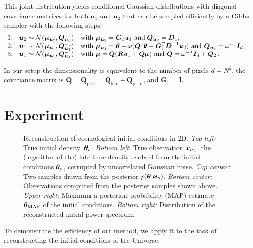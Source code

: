 This joint distribution yields conditional Gaussian distributions with diagonal covariance matrices for both $\bm u_1$ and $\bm u_2$ that can be sampled efficiently by a Gibbs sampler with the following steps:
\begin{equation}
\begin{array}{ccl}
    1. & \bm u_2\sim\mathcal{N}(\bm \mu_{\bm u_2}, \bm Q^{-1}_{\bm u_2}) & \text{with } \bm \mu_{\bm u_2} = \bm G_1 \bm u_1 \text{ and }\bm Q_{\boldsymbol u_2} = \boldsymbol D_1, \\
    2.  & \bm u_1\sim\mathcal{N}(\bm \mu_{\bm u_1}, \bm Q^{-1}_{\bm u_1})  & \text{with } \bm \mu_{\bm u_1} = \bm{\theta} - \omega(\bm Q_1 \bm{\theta} - \bm G_1^T \bm D_1^{-1} \bm u_2) \text{ and } \bm Q_{\bm u_1} = \omega^{-1} \bm I_d, \\
    3.  & \bm u_1\sim\mathcal{N}(\bm \mu_{\bm u_1}, \bm Q^{-1}_{\bm u_1}) & \text{with }\bm \mu = \bm Q(\bm R \bm  u_1 + \bm  Q \bm \mu) \text{ and } \bm Q = \omega^{-1} \bm I_d + \bm Q_2 \;.
\end{array}
\end{equation}

In our setup the dimensionality is equivalent to the number of pixels $d=N^2$, the covariance matrix is $\bm Q = \bm Q_{\text{post}} = \bm Q_{\text{like}} + \bm Q_{\text{prior}}$, and $\bm G_1= \bm I$.


\section{Experiment} \label{sec:cosmo-exp}
\begin{figure}
    \centering
    \caption{Reconstruction of cosmological initial conditions in 2D. {\it Top left:} True initial density~${\bm{\theta}}_o$. {\it Bottom left}: True observation ${\bm{x}}_o$, \ie\ the (logarithm of the) late-time density evolved from the initial conditions ${\bm{\theta}}_o$, corrupted by uncorrelated Gaussian noise. {\it Top center:} Two samples drawn from the posterior $p(\bm{\theta} | \bm {\bm{x}}_o)$. {\it Bottom center:} Observations computed from the posterior samples shown above. {\it Upper right:} Maximum-a-posteriori probability (MAP) estimate ${\bm{\theta}}_{\text{MAP}}$ of the initial conditions. {\it Bottom right:} Distribution of the reconstructed initial power spectrum.}
    \label{fig:results}
\end{figure} 

To demonstrate the efficiency of our method, we apply it to the task of reconstructing the initial conditions of the Universe. 

